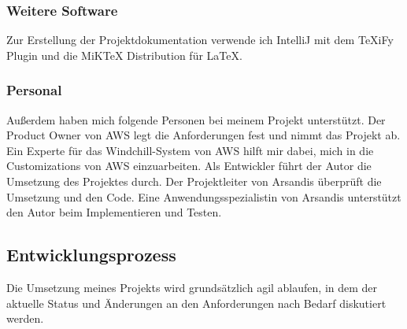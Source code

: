 \subsubsection{Weitere Software}
Zur Erstellung der Projektdokumentation verwende ich IntelliJ mit dem TeXiFy Plugin und die MiKTeX Distribution für LaTeX.

\subsubsection{Personal}
Außerdem haben mich folgende Personen bei meinem Projekt unterstützt.
Der Product Owner von \acs{AWS} legt die Anforderungen fest und nimmt das Projekt ab.
Ein Experte für das Windchill-System von \acs{AWS} hilft mir dabei, mich in die Customizations von \acs{AWS} einzuarbeiten.
Als Entwickler führt der Autor die Umsetzung des Projektes durch.
Der Projektleiter von Arsandis überprüft die Umsetzung und den Code.
Eine Anwendungsspezialistin von Arsandis unterstützt den Autor beim Implementieren und Testen.

\subsection{Entwicklungsprozess}
\label{sec:Entwicklungsprozess}

Die Umsetzung meines Projekts wird grundsätzlich agil ablaufen, in dem der aktuelle Status und Änderungen an den Anforderungen nach Bedarf diskutiert werden.
